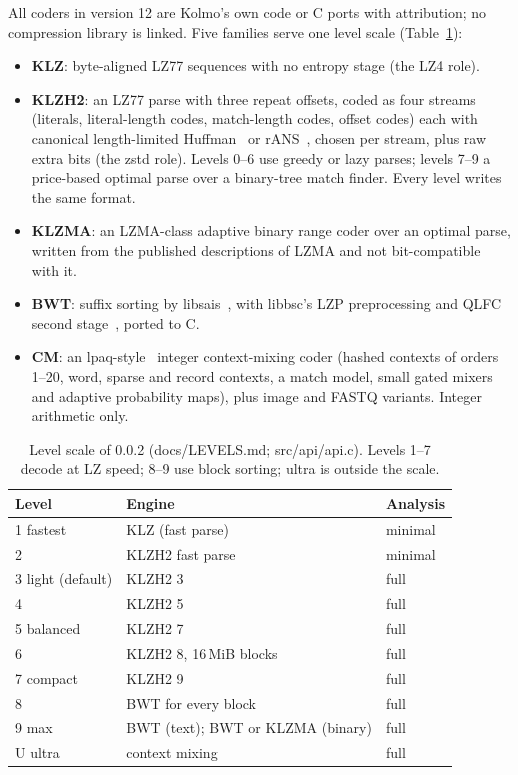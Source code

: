 \documentclass[conference]{IEEEtran}
\begin{document}
All coders in version 12 are Kolmo's own code or C ports with attribution; no compression library is linked. Five
families serve one level scale (Table~\ref{tab:levels}):
\begin{itemize}
\item \textbf{KLZ}: byte-aligned LZ77 sequences with no entropy stage (the LZ4 role).
\item \textbf{KLZH2}: an LZ77 parse with three repeat offsets, coded as four streams (literals, literal-length codes,
match-length codes, offset codes) each with canonical length-limited Huffman~\cite{huffman} or rANS~\cite{ans}, chosen per stream, plus raw
extra bits (the zstd role). Levels 0--6 use greedy or lazy parses; levels 7--9 a price-based optimal parse over a
binary-tree match finder. Every level writes the same format.
\item \textbf{KLZMA}: an LZMA-class adaptive binary range coder over an optimal parse, written from the published
descriptions of LZMA and not bit-compatible with it.
\item \textbf{BWT}: suffix sorting by libsais~\cite{libsais,sais}, with libbsc's LZP preprocessing and QLFC
second stage~\cite{bsc}, ported to C.
\item \textbf{CM}: an lpaq-style~\cite{lpaq} integer context-mixing coder (hashed contexts of orders 1--20, word,
sparse and record contexts, a match model, small gated mixers and adaptive probability maps), plus image and FASTQ
variants. Integer arithmetic only.
\end{itemize}

\begin{table}[t]
\caption{Level scale of 0.0.2 (docs/LEVELS.md; src/api/api.c). Levels 1--7 decode at LZ speed; 8--9 use block
sorting; ultra is outside the scale.}\label{tab:levels}
\centering\footnotesize
\begin{tabular}{@{}lll@{}}
\toprule
Level & Engine & Analysis \\ \midrule
1 fastest & KLZ (fast parse) & minimal \\
2 & KLZH2 fast parse & minimal \\
3 light (default) & KLZH2 3 & full \\
4 & KLZH2 5 & full \\
5 balanced & KLZH2 7 & full \\
6 & KLZH2 8, 16\,MiB blocks & full \\
7 compact & KLZH2 9 & full \\
8 & BWT for every block & full \\
9 max & BWT (text); BWT or KLZMA (binary) & full \\
U ultra & context mixing & full \\
\bottomrule
\end{tabular}
\end{table}
\end{document}

